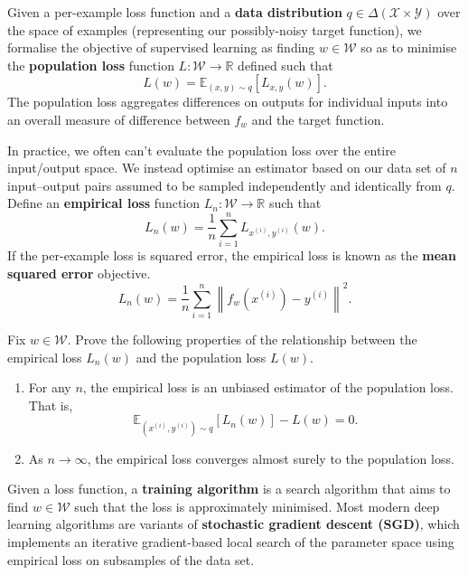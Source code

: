 \documentclass[11pt]{article}
\newcommand{\R}{\mathbb{R}}
\newcommand{\E}{\mathbb{E}}
\newcommand{\X}{\mathcal{X}}
\newcommand{\Y}{\mathcal{Y}}
\newcommand{\W}{\mathcal{W}}
\begin{document}
Given a per-example loss function and a \textbf{data distribution}
    $q \in \Delta(\X\times\Y)$
over the space of examples (representing our possibly-noisy target function),
we formalise the objective of supervised learning as finding $w \in \W$ so as
to minimise the \textbf{population loss} function
    $L : \W \to \R$
defined such that
\begin{equation}
    L(w) = \E_{(x,y) \sim q}[L_{x,y}(w)].
\end{equation}
The population loss aggregates differences on outputs for individual inputs
into an overall measure of difference between $f_w$ and the target function.

In practice, we often can't evaluate the population loss over the entire
input/output space. We instead optimise an estimator based on our data set of
$n$ input--output pairs assumed to be sampled independently and identically
from $q$. Define an \textbf{empirical loss} function
    $L_n : \W \to \R$
such that
\begin{equation}
    L_n(w) = \frac1n \sum_{i=1}^n L_{x^{(i)},y^{(i)}}(w).
\end{equation}
If the per-example loss is squared error, the empirical loss is known as the
\textbf{mean squared error} objective.
\begin{equation}
    \label{eq:mse}
    L_n(w)
    =
    \frac1n \sum_{i=1}^n \left\| f_w(x^{(i)}) - y^{(i)} \right\|^2.
\end{equation}

\begin{exercise}
    \label{ex:empirical-population-loss}
    Fix $w \in \W$. Prove the following properties of the relationship between
    the empirical loss $L_n(w)$ and the population loss $L(w)$.
\begin{enumerate}
    \item
        For any $n$, the empirical loss is an unbiased estimator of the
        population loss. That is,
        \begin{equation}
            \E_{(x^{(i)}, y^{(i)}) \sim q}[L_n(w)] - L(w)
            = 0.
        \end{equation}
    \item
        As $n \to \infty$, the empirical loss converges almost surely to the
        population loss.
\end{enumerate}
\end{exercise}

Given a loss function, a \textbf{training algorithm} is a search algorithm that
aims to find $w \in \W$ such that the loss is approximately minimised. Most
modern deep learning algorithms are variants of \textbf{stochastic gradient
descent (SGD)}, which implements an iterative gradient-based local search of
the parameter space using empirical loss on subsamples of the data set.
\end{document}
